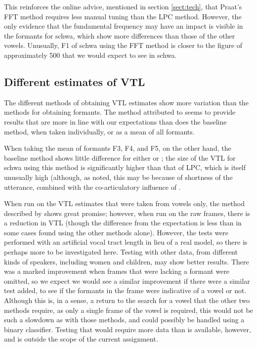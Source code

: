 \documentclass[11pt]{article}
\begin{document}
This reinforces the online advice, mentioned in section \ref{sect:tech}, that Praat's FFT method requires less manual tuning than the LPC method. However, the only evidence that the fundamental frequency may have an impact is visible in the formants for schwa, which show more differences than those of the other vowels. Unusually, F1 of schwa using the FFT method is closer to the figure of approximately 500 that we would expect to see in schwa.

\subsection{Different estimates of VTL}
\label{sect:diff}

The different methods of obtaining VTL estimates show more variation than the methods for obtaining formants. The method attributed to \citet{necioglu2000unsupervised} seems to provide results that are more in line with our expectations than does the baseline method, when taken individually, or as a mean of all formants.

When taking the mean of formants F3, F4, and F5, on the other hand, the baseline method shows little difference for either  or ; the size of the VTL for schwa using this method is significantly higher than that of LPC, which is itself unusually high (although, as noted, this may be because of shortness of the utterance, combined with the co-articulatory influence of .

When run on the VTL estimates that were taken from vowels only, the method described by \citet{rodriguez2010line} shows great promise; however, when run on the raw frames, there is a reduction in VTL (though the difference from the expectation is less than in some cases found using the other methods alone). However, the tests were performed with an artificial vocal tract length in lieu of a real model, so there is perhaps more to be investigated here. Testing with other data, from different kinds of speakers, including women and children, may show better results. There was a marked improvement when frames that were lacking a formant were omitted, so we expect we would see a similar improvement if there were a similar test added, to see if the formants in the frame were indicative of a vowel or not. Although this is, in a sense, a return to the search for a vowel that the other two methods require, as only a single frame of the vowel is required, this would not be such a slowdown as with those methods, and could possibly be handled using a binary classifier. Testing that would require more data than is available, however, and is outside the scope of the current assignment.
\end{document}
